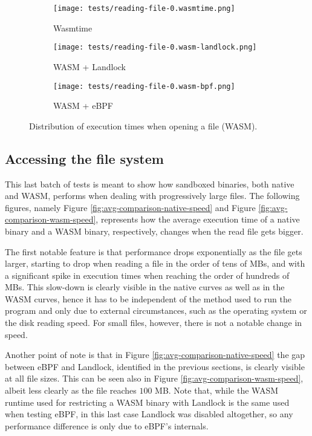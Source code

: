 \begin{figure}[ht]
  \centering
  \begin{subfigure}[b]{0.32\textwidth}
    \centering
    \texttt{[image: tests/reading-file-0.wasmtime.png]}
    \caption{Wasmtime}
  \end{subfigure}
  \begin{subfigure}[b]{0.32\textwidth}
    \centering
    \texttt{[image: tests/reading-file-0.wasm-landlock.png]}
    \caption{WASM + Landlock}
  \end{subfigure}
  \begin{subfigure}[b]{0.32\textwidth}
    \centering
    \texttt{[image: tests/reading-file-0.wasm-bpf.png]}
    \caption{WASM + eBPF}
  \end{subfigure}
  \caption{Distribution of execution times when opening a file (WASM).}
  \label{fig:distribution-opening-wasm}
\end{figure}

\subsection{Accessing the file system}

This last batch of tests is meant to show how sandboxed binaries, both native and WASM, performs when
dealing with progressively large files.
The following figures, namely Figure \ref{fig:avg-comparison-native-speed} and Figure \ref{fig:avg-comparison-wasm-speed},
represents how the average execution time of a native binary and a WASM binary, respectively, changes
when the read file gets bigger.

The first notable feature is that performance drops exponentially as the file gets larger,
starting to drop when reading a file in the order of tens of MBs, and with a significant
spike in execution times when reaching the order of hundreds of MBs.
This slow-down is clearly visible in the native curves as well as in the WASM curves,
hence it has to be independent of the method used to run the
program and only due to external circumstances, such as the operating system or the disk reading speed.
For small files, however, there is not a notable change in speed.

Another point of note is that in Figure \ref{fig:avg-comparison-native-speed} the gap between eBPF and Landlock,
identified in the previous sections, is clearly visible at all file sizes.
This can be seen also in Figure \ref{fig:avg-comparison-wasm-speed}, albeit less clearly as the file reaches $100$ MB.
Note that, while the WASM runtime used for restricting a WASM binary with Landlock is the same used when testing eBPF,
in this last case Landlock was disabled altogether, so any performance difference is only due to eBPF's internals.

